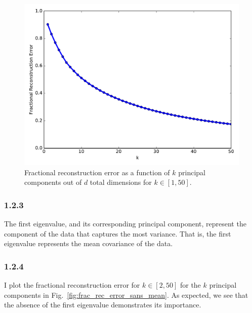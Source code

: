 \documentclass[12pt]{amsart}
\begin{document}
\begin{figure}[H]
	\includegraphics[width=\columnwidth]{fractional_rec_error.pdf}
    \caption{Fractional reconstruction error as a function of $k$ principal components out of $d$ total dimensions for $k \in [1,50]$.}
    \label{fig:frac_rec_error}
\end{figure}


\subsubsection*{1.2.3}

The first eigenvalue, and its corresponding principal component, represent the component of the data that captures the most variance.  That is, the first eigenvalue represents the mean covariance of the data.

\subsubsection*{1.2.4}

I plot the fractional reconstruction error for $k \in [2,50]$ for the $k$ principal components in Fig.~\ref{fig:frac_rec_error_sans_mean}.  As expected, we see that the absence of the first eigenvalue demonstrates its importance.
\end{document}
